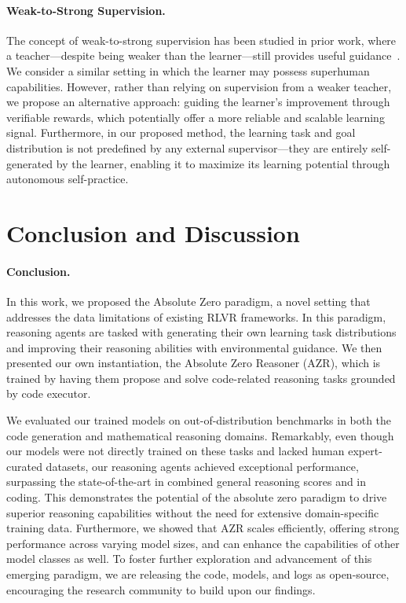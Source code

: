 \documentclass{article}
\begin{document}
\paragraph{Weak-to-Strong Supervision.} 
The concept of weak-to-strong supervision has been studied in prior work, where a teacher—despite being weaker than the learner—still provides useful guidance~\citep{burns2023weak,hinton2015distilling,christiano2018approval,christiano2019capability,demski2019embedded,leike2023superalignment,hubinger2019risks}. We consider a similar setting in which the learner may possess superhuman capabilities. However, rather than relying on supervision from a weaker teacher, we propose an alternative approach: guiding the learner's improvement through verifiable rewards, which potentially offer a more reliable and scalable learning signal. Furthermore, in our proposed method, the learning task and goal distribution is not predefined by any external supervisor—they are entirely self-generated by the learner, enabling it to maximize its learning potential through autonomous self-practice.

\section{Conclusion and Discussion}
\paragraph{Conclusion.} In this work, we proposed the Absolute Zero paradigm, a novel setting that addresses the data limitations of existing RLVR frameworks. In this paradigm, reasoning agents are tasked with generating their own learning task distributions and improving their reasoning abilities with environmental guidance. We then presented our own instantiation, the Absolute Zero Reasoner (AZR), which is trained by having them propose and solve code-related reasoning tasks grounded by code executor.

We evaluated our trained models on out-of-distribution benchmarks in both the code generation and mathematical reasoning domains. Remarkably, even though our models were not directly trained on these tasks and lacked human expert-curated datasets, our reasoning agents achieved exceptional performance, surpassing the state-of-the-art in combined general reasoning scores and in coding. This demonstrates the potential of the absolute zero paradigm to drive superior reasoning capabilities without the need for extensive domain-specific training data. Furthermore, we showed that AZR scales efficiently, offering strong performance across varying model sizes, and can enhance the capabilities of other model classes as well. To foster further exploration and advancement of this emerging paradigm, we are releasing the code, models, and logs as open-source, encouraging the research community to build upon our findings.
\end{document}
